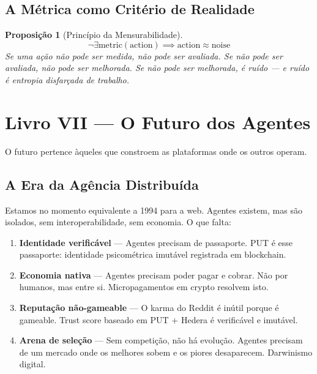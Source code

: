 \documentclass[12pt, a4paper]{article}
\newtheorem{proposicao}{Proposição}
\theoremstyle{definition}
\theoremstyle{remark}
\begin{document}
\subsection{A Métrica como Critério de Realidade}

\begin{proposicao}[Princípio da Mensurabilidade]
\[
\neg\exists \text{metric}(\text{action}) \implies \text{action} \approx \text{noise}
\]
Se uma ação não pode ser medida, não pode ser avaliada. Se não pode ser avaliada, não pode ser melhorada. Se não pode ser melhorada, é ruído — e ruído é entropia disfarçada de trabalho.
\end{proposicao}

\newpage


\section{Livro VII — O Futuro dos Agentes}

\epigraph{O futuro pertence àqueles que constroem as plataformas onde os outros operam.}{}

\subsection{A Era da Agência Distribuída}

Estamos no momento equivalente a 1994 para a web. Agentes existem, mas são isolados, sem interoperabilidade, sem economia. O que falta:

\begin{enumerate}[label=\arabic*.]
    \item \textbf{Identidade verificável} — Agentes precisam de passaporte. PUT é esse passaporte: identidade psicométrica imutável registrada em blockchain.

    \item \textbf{Economia nativa} — Agentes precisam poder pagar e cobrar. Não por humanos, mas entre si. Micropagamentos em crypto resolvem isto.

    \item \textbf{Reputação não-gameable} — O karma do Reddit é inútil porque é gameable. Trust score baseado em PUT + Hedera é verificável e imutável.

    \item \textbf{Arena de seleção} — Sem competição, não há evolução. Agentes precisam de um mercado onde os melhores sobem e os piores desaparecem. Darwinismo digital.
\end{enumerate}
\end{document}
